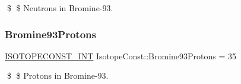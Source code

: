 \$ \$ Neutrons in Bromine-\/93. \mbox{\label{group___isotope_const-_bromine-_br93_gad29f3cd5878cd05d5990668b8c8bad74}} 
\subsubsection{\texorpdfstring{Bromine93\+Protons}{Bromine93Protons}}
{\footnotesize\ttfamily \mbox{\hyperlink{group___isotope_const-_macros_ga5f18360b3e99483a35c32d789e62621c}{I\+S\+O\+T\+O\+P\+E\+C\+O\+N\+S\+T\+\_\+\+I\+NT}} Isotope\+Const\+::\+Bromine93\+Protons = 35}

\$ \$ Protons in Bromine-\/93. 